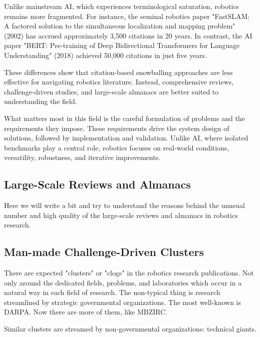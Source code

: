 \documentclass[runningheads]{llncs}
\begin{document}
Unlike mainstream AI, which experiences terminological saturation, robotics remains more fragmented. For instance, the seminal robotics paper "FastSLAM: A factored solution to the simultaneous localization and mapping problem" (2002) has accrued approximately 3,500 citations in 20 years. In contrast, the AI paper "BERT: Pre-training of Deep Bidirectional Transformers for Language Understanding" (2018) achieved 50,000 citations in just five years. 

These differences show that citation-based snowballing approaches are less effective for navigating robotics literature. Instead, comprehensive reviews, challenge-driven studies, and large-scale almanacs are better suited to understanding the field.

What matters most in this field is the careful formulation of problems and the requirements they impose. These requirements drive the system design of solutions, followed by implementation and validation. Unlike AI, where isolated benchmarks play a central role, robotics focuses on real-world conditions, versatility, robustness, and iterative improvements.

\subsection{Large-Scale Reviews and Almanacs}

Here we will write a bit and try to understand the reasons behind the unusual number and high quality of the large-scale reviews and almanacs in robotics research. 

\subsection{Man-made Challenge-Driven Clusters}

There are expected "clusters" or "clogs" in the robotics research publications. Not only around the dedicated fields, problems, and laboratories which occur in a natural way in each field of research.
The non-typical thing is research streamlined by strategic governmental organizations. The most well-known is DARPA. Now there are more of them, like MBZIRC. 

Similar clusters are streamed by non-governmental organizations: technical giants. 
\end{document}
